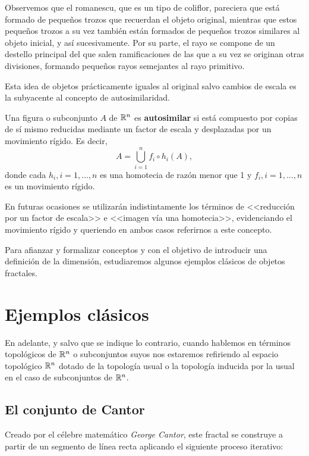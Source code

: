 Observemos que el romanescu, que es un tipo de coliflor, pareciera que está formado de pequeños trozos que recuerdan el objeto original, mientras que estos pequeños trozos a su vez también están formados de pequeños trozos similares al objeto inicial, y así sucesivamente. Por su parte, el rayo se compone de un destello principal del que salen ramificaciones de las que a su vez se originan otras divisiones, formando pequeños rayos semejantes al rayo primitivo.

Esta idea de objetos prácticamente iguales al original salvo cambios de escala es la subyacente al concepto de autosimilaridad.

\begin{definicion}[Autosimilaridad] 
\label{def:autosimilaridad}  
Una figura o subconjunto $A$ de $\mathbb{R}^n$ es \textbf{autosimilar} si está compuesto por copias de sí mismo reducidas mediante un factor de escala y desplazadas por un movimiento rígido. Es decir,
$$
A = \bigcup_{i=1}^n f_i\circ h_i(A),
$$
donde cada $h_i, i=1,\dots,n$ es una homotecia de razón menor que 1 y $f_i, i=1,\dots,n$ es un movimiento rígido. 
\end{definicion}

En futuras ocasiones se utilizarán indistintamente los términos de <<reducción por un factor de escala>> e <<imagen vía una homotecia>>, evidenciando el movimiento rígido y queriendo en ambos casos referirnos a este concepto.

Para afianzar y formalizar conceptos y con el objetivo de introducir una definición de la dimensión, estudiaremos algunos ejemplos clásicos de objetos fractales.

\section{Ejemplos clásicos}
\label{section:ejemplos}

En adelante, y salvo que se indique lo contrario, cuando hablemos en términos topológicos de $\mathbb{R}^n$ o subconjuntos suyos nos estaremos refiriendo al espacio topológico $\mathbb{R}^n$ dotado de la topología usual o la topología inducida por la usual en el caso de subconjuntos de $\mathbb{R}^n$.

\subsection{El conjunto de Cantor}
\label{subsection:Cantor}

Creado por el célebre matemático \textit{George Cantor}, este fractal se construye a partir de un segmento de línea recta aplicando el siguiente proceso iterativo:

